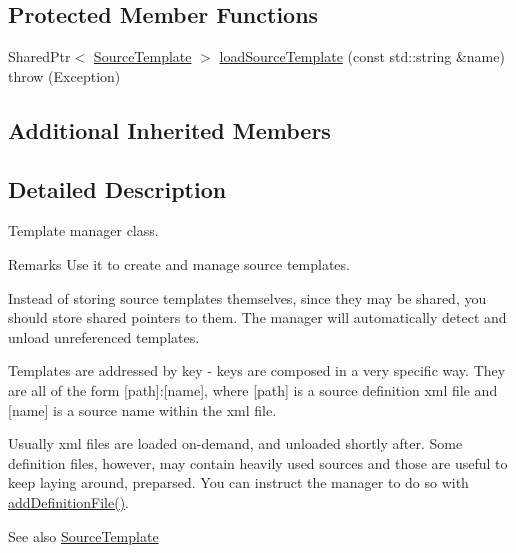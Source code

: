 \subsection*{Protected Member Functions}
\begin{DoxyCompactItemize}
\item 
Shared\+Ptr$<$ \hyperlink{classAudio_1_1SourceTemplate}{Source\+Template} $>$ \hyperlink{classAudio_1_1TemplateManager_ac3893d12dc6caaa5f5c443b6834fd0aa}{load\+Source\+Template} (const std\+::string \&name)  throw (\+Exception)
\end{DoxyCompactItemize}
\subsection*{Additional Inherited Members}


\subsection{Detailed Description}
Template manager class.

\begin{DoxyRemark}{Remarks}
Use it to create and manage source templates. 
\end{DoxyRemark}
\begin{DoxyParagraph}{Instead of storing source templates themselves, since they may be shared,}
you should store shared pointers to them. The manager will automatically detect and unload unreferenced templates. 
\end{DoxyParagraph}
\begin{DoxyParagraph}{Templates are addressed by key -\/ keys are composed in a very specific way.}
They are all of the form \mbox{[}path\mbox{]}\+:\mbox{[}name\mbox{]}, where \mbox{[}path\mbox{]} is a source definition xml file and \mbox{[}name\mbox{]} is a source name within the xml file. 
\end{DoxyParagraph}
\begin{DoxyParagraph}{Usually xml files are loaded on-\/demand, and unloaded shortly after. Some}
definition files, however, may contain heavily used sources and those are useful to keep laying around, preparsed. You can instruct the manager to do so with \hyperlink{classAudio_1_1TemplateManager_a2b119f54bfe5273f5d4cdae9068189b1}{add\+Definition\+File()}. 
\end{DoxyParagraph}
\begin{DoxySeeAlso}{See also}
\hyperlink{classAudio_1_1SourceTemplate}{Source\+Template} 
\end{DoxySeeAlso}


